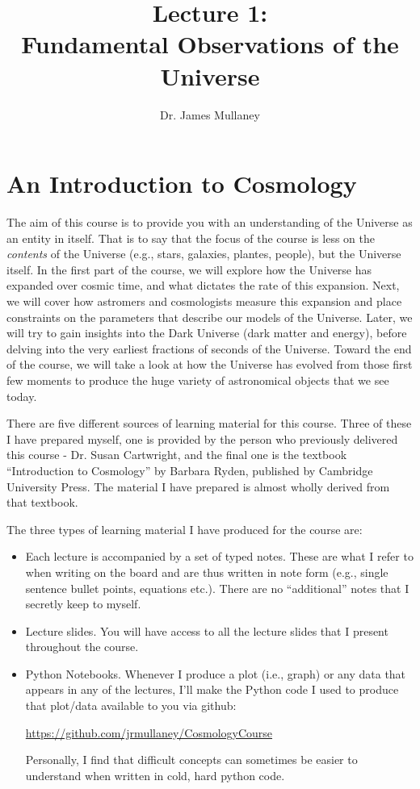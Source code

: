 \documentclass[11pt]{article}
\begin{document}
 
\title{Lecture 1:\\Fundamental Observations of the Universe}
\author{Dr. James Mullaney}
\maketitle

\section{An Introduction to Cosmology}
The aim of this course is to provide you with an understanding of the Universe as an entity in itself. That is to say that the focus of the course is less on the {\it contents} of the Universe (e.g., stars, galaxies, plantes, people), but the Universe itself. In the first part of the course, we will explore how the Universe has expanded over cosmic time, and what dictates the rate of this expansion. Next, we will cover how astromers and cosmologists measure this expansion and place constraints on the parameters that describe our models of the Universe. Later, we will try to gain insights into the Dark Universe (dark matter and energy), before delving into the very earliest fractions of seconds of the Universe. Toward the end of the course, we will take a look at how the Universe has evolved from those first few moments to produce the huge variety of astronomical objects that we see today.

There are five different sources of learning material for this course. Three of these I have prepared myself, one is provided by the person who previously delivered this course - Dr. Susan Cartwright, and the final one is the textbook ``Introduction to Cosmology'' by Barbara Ryden, published by Cambridge University Press. The material I have prepared is almost wholly derived from that textbook.

The three types of learning material I have produced for the course are:
\begin{itemize}
\item Each lecture is accompanied by a set of typed notes. These are what I refer to when writing on the board and are thus written in note form (e.g., single sentence bullet points, equations etc.). There are no ``additional'' notes that I secretly keep to myself.
\item Lecture slides. You will have access to all the lecture slides that I present throughout the course.
\item Python Notebooks. Whenever I produce a plot (i.e., graph) or any data that appears in any of the lectures, I'll make the Python code I used to produce that plot/data available to you via github:

\noindent
\url{https://github.com/jrmullaney/CosmologyCourse}

Personally, I find that difficult concepts can sometimes be easier to understand when written in cold, hard python code.
\end{itemize}
\end{document}
